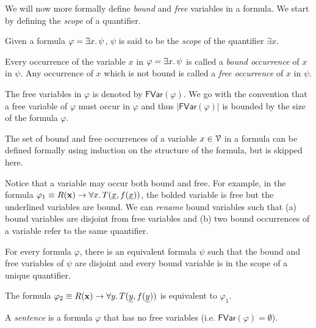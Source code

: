 \documentclass[11pt,usenames, dvipsnames]{article}
\begin{document}
We will now more formally define \emph{bound} and \emph{free} variables in a formula. We start by defining the \emph{scope} of a quantifier.

\begin{definition}[Scope]
  Given a formula $\varphi = \exists x \ldotp \psi$, $\psi$ is said to be the \emph{scope} of the quantifier $\exists x$.
\end{definition}

\begin{definition}
  Every occurrence of the variable $x$ in $\varphi = \exists x \ldotp \psi$ is called a \emph{bound occurrence} of $x$ in $\psi$. Any occurrence of $x$ which is not bound is called a \emph{free occurrence} of $x$ in $\psi$.

  The free variables in $\varphi$ is denoted by $\mathsf{FVar}(\varphi)$. We go with the convention that a free variable of $\varphi$ must occur in $\varphi$ and thus $|\mathsf{FVar}(\varphi)|$ is bounded by the size of the formula $\varphi$.

  The set of bound and free occurrences of a variable $x \in \vars$ in a formula can be defined formally using induction on the structure of the formula, but is skipped here.
\end{definition}

Notice that a variable may occur both bound and free. For example, in the formula $\varphi_1 \equiv R(\mathbf{x}) \to \forall x \ldotp T(\underline{x}, f(\underline{x}))$, the bolded variable is free but the underlined variables are bound. We can \emph{rename} bound variables such that (a) bound variables are disjoint from free variables and (b) two bound occurrences of a variable refer to the same quantifier.

\begin{claim}
  For every formula $\varphi$, there is an equivalent formula $\psi$ such that the bound and free variables of $\psi$ are disjoint and every bound variable is in the scope of a unique quantifier.
\end{claim}

\begin{example}
  The formula $\varphi_2 \equiv R(\mathbf{x}) \to \forall y \ldotp T(\underline{y}, f(\underline{y}))$ is equivalent to $\varphi_1$.
\end{example}

\begin{definition}[Sentence]
  A \emph{sentence} is a formula $\varphi$ that has no free variables (i.e. $\mathsf{FVar}(\varphi) = \emptyset$).
\end{definition}
\end{document}
